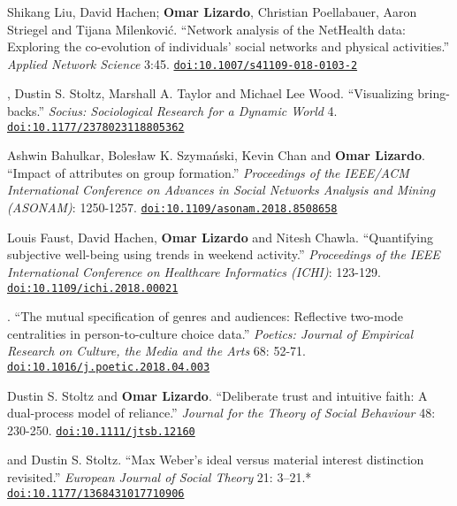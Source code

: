 
\ind Shikang Liu, David Hachen; {\bf Omar Lizardo}, Christian Poellabauer, Aaron Striegel and Tijana Milenkovi\'{c}. ``Network analysis of the NetHealth data: Exploring the co-evolution of individuals' social networks and physical activities.'' {\em Applied Network Science} 3:45. 
\newline
\href{https://doi.org/10.1007/s41109-018-0103-2}{\nolinkurl{doi:10.1007/s41109-018-0103-2}}

, Dustin S. Stoltz, Marshall A. Taylor and Michael Lee Wood. ``Visualizing bring-backs.'' {\em Socius: Sociological Research for a Dynamic World} 4. \href{https://doi.org/10.1177/2378023118805362}{\nolinkurl{doi:10.1177/2378023118805362}}

\ind Ashwin Bahulkar, Boles\l{}aw K. Szyma\'{n}ski, Kevin Chan and {\bf Omar Lizardo}. ``Impact of attributes on group formation.'' {\em Proceedings of the IEEE/ACM International Conference on Advances in Social Networks Analysis and Mining (ASONAM)}: 1250-1257. \href{https://doi.org/10.1109/asonam.2018.8508658}{\nolinkurl{doi:10.1109/asonam.2018.8508658}} 

\ind Louis Faust, David Hachen, {\bf Omar Lizardo} and Nitesh Chawla. ``Quantifying subjective well-being using trends in weekend activity.'' {\em Proceedings of the IEEE International Conference on Healthcare Informatics (ICHI)}: 123-129. \href{https://doi.org/10.1109/ichi.2018.00021}{\nolinkurl{doi:10.1109/ichi.2018.00021}}

. ``The mutual specification of genres and audiences: Reflective two-mode centralities in person-to-culture choice data.'' {\em Poetics: Journal of Empirical Research on Culture, the Media and the Arts} 68: 52-71. \href{https://doi.org/10.1016/j.poetic.2018.04.003}{\nolinkurl{doi:10.1016/j.poetic.2018.04.003}}

\ind Dustin S. Stoltz and {\bf Omar Lizardo}. ``Deliberate trust and intuitive faith: A dual-process model of reliance.'' {\em Journal for the Theory of Social Behaviour} 48: 230-250. \href{https://doi.org/10.1111/jtsb.12160}{\nolinkurl{doi:10.1111/jtsb.12160}}

 and Dustin S. Stoltz. ``Max Weber's ideal versus material interest distinction revisited.'' {\em European Journal of Social Theory} 21: 3–21.\textcolor{uclablue}{*} \href{https://doi.org/10.1177/1368431017710906}{\nolinkurl{doi:10.1177/1368431017710906}}